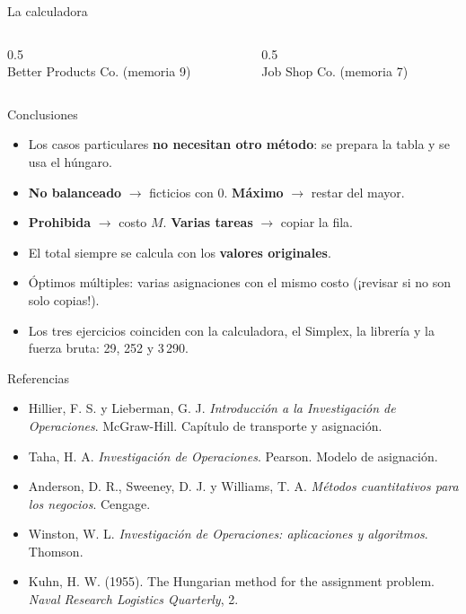 \documentclass[aspectratio=169]{beamer}
\begin{document}
\begin{frame}{La calculadora}
  \begin{columns}[c]
    \begin{column}{0.5\textwidth}
      \centering
      \\[2pt]
      {\scriptsize Better Products Co. (memoria 9)}
    \end{column}
    \begin{column}{0.5\textwidth}
      \centering
      \\[2pt]
      {\scriptsize Job Shop Co. (memoria 7)}
    \end{column}
  \end{columns}
\end{frame}

\begin{frame}{Conclusiones}
  \begin{itemize}\setlength{\itemsep}{0.5em}
    \item Los casos particulares \textbf{no necesitan otro método}: se prepara la tabla y se usa el húngaro.
    \item \textbf{No balanceado} $\to$ ficticios con 0. \quad \textbf{Máximo} $\to$ restar del mayor.
    \item \textbf{Prohibida} $\to$ costo $M$. \quad \textbf{Varias tareas} $\to$ copiar la fila.
    \item El total siempre se calcula con los \textbf{valores originales}.
    \item Óptimos múltiples: varias asignaciones con el mismo costo (¡revisar si no son solo copias!).
    \item Los tres ejercicios coinciden con la calculadora, el Simplex, la librería y la fuerza bruta: 29, 252 y 3\,290.
  \end{itemize}
\end{frame}

\begin{frame}{Referencias}
  \small
  \begin{itemize}\setlength{\itemsep}{0.6em}
    \item Hillier, F. S. y Lieberman, G. J. \textit{Introducción a la Investigación de Operaciones}. McGraw-Hill.
          Capítulo de transporte y asignación.
    \item Taha, H. A. \textit{Investigación de Operaciones}. Pearson. Modelo de asignación.
    \item Anderson, D. R., Sweeney, D. J. y Williams, T. A. \textit{Métodos cuantitativos para los negocios}. Cengage.
    \item Winston, W. L. \textit{Investigación de Operaciones: aplicaciones y algoritmos}. Thomson.
    \item Kuhn, H. W. (1955). The Hungarian method for the assignment problem. \textit{Naval Research Logistics Quarterly}, 2.
  \end{itemize}
\end{frame}
\end{document}
